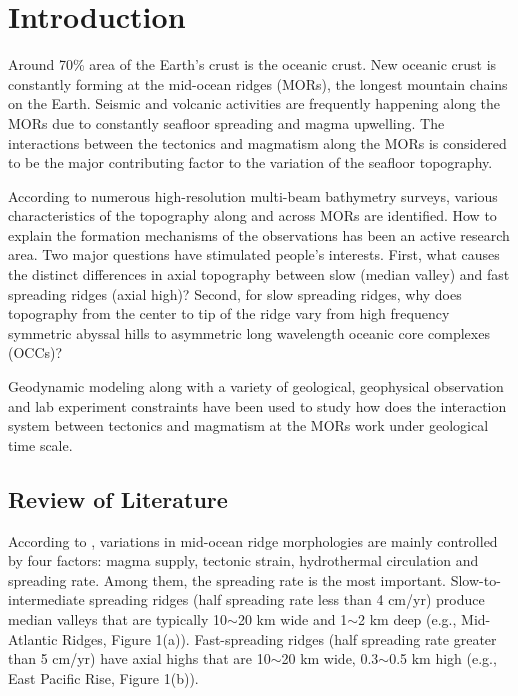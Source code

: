 \pagebreak
\section{Introduction}
\label{ch:Intro}  %

Around 70\% area of the Earth's crust is the oceanic crust. New oceanic crust is constantly forming at the mid-ocean ridges (MORs), the longest mountain chains on the Earth. Seismic and volcanic activities are frequently happening along the MORs due to constantly seafloor spreading and magma upwelling. The interactions between the tectonics and magmatism along the MORs is considered to be the major contributing factor to the variation of the seafloor topography.    

According to numerous high-resolution multi-beam bathymetry surveys, various characteristics of the topography along and across MORs are identified. How to explain the formation mechanisms of the observations has been an active research area. Two major questions have stimulated people's interests. First, what causes the distinct differences in axial topography between slow (median valley) and fast spreading ridges (axial high)? Second, for slow spreading ridges, why does topography from the center to tip of the ridge vary from high frequency symmetric abyssal hills to asymmetric long wavelength oceanic core complexes (OCCs)?

Geodynamic modeling along with a variety of geological, geophysical observation and lab experiment constraints have been used to study how does the interaction system between tectonics and magmatism at the MORs work under geological time scale.

\subsection{Review of Literature}
According to \citep{Fowler2004}, variations in  mid-ocean ridge morphologies are mainly controlled by four factors: magma supply, tectonic strain, hydrothermal circulation and spreading rate. Among them, the spreading rate is the most important. Slow-to-intermediate spreading ridges (half spreading rate less than 4 cm/yr) produce median valleys that are typically 10$\sim$20 km wide and 1$\sim$2 km deep (e.g., Mid-Atlantic Ridges, Figure 1(a)). Fast-spreading ridges (half spreading rate greater than 5 cm/yr) have axial highs that are 10$\sim$20 km wide, 0.3$\sim$0.5 km high (e.g., East Pacific Rise, Figure 1(b)).

